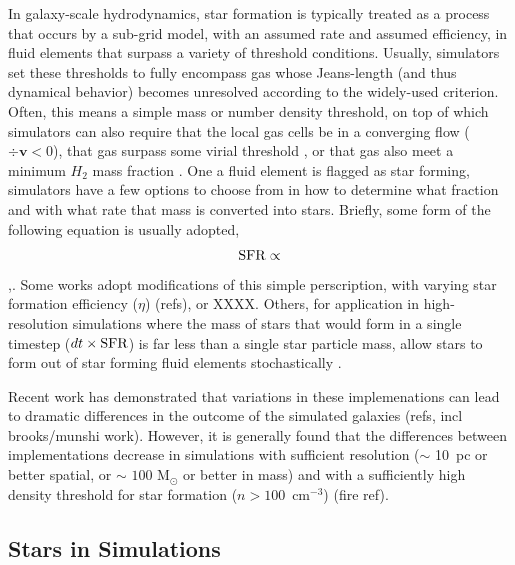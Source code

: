In galaxy-scale hydrodynamics, star formation is typically treated as a process that occurs by a sub-grid model, with an assumed rate and assumed efficiency, in fluid elements that surpass a variety of threshold conditions. Usually, simulators set these thresholds to fully encompass gas whose Jeans-length (and thus dynamical behavior) becomes unresolved according to the widely-used \cite{Truelove1997} criterion. Often, this means a simple mass or number density threshold, on top of which simulators can also require that the local gas cells be in a converging flow ($\div \bm{v} < 0$), that gas surpass some virial threshold \citep[e.g.][]{}, or that gas also meet a minimum $H_2$ mass fraction \citep[e.g.][]{}. One a fluid element is flagged as star forming, simulators have a few options to choose from in how to determine what fraction and with what rate that mass is converted into stars. Briefly, some form of the following equation is usually adopted,
\begin{equation}
\label{intro:eq:sfr}
 \rm{SFR} \propto 
\end{equation}
,. Some works adopt modifications of this simple perscription, with varying star formation efficiency ($\eta$) (refs), or XXXX. Others, for application in high-resolution simulations where the mass of stars that would form in a single timestep ($dt \times \rm{SFR}$) is far less than a single star particle mass, allow stars to form out of star forming fluid elements stochastically \citep[e.g.][]{Goldbaum2015}.

Recent work has demonstrated that variations in these implemenations can lead to dramatic differences in the outcome of the simulated galaxies (refs, incl brooks/munshi work). However, it is generally found that the differences between implementations decrease in simulations with sufficient resolution ($\sim$ 10~pc or better spatial, or $\sim$ $100$ M$_{\odot}$ or better in mass) and with a sufficiently high density threshold for star formation ($n > 100$~cm$^{-3}$) (fire ref). 


\subsection{Stars in Simulations} \label{intro:sec:stars}

